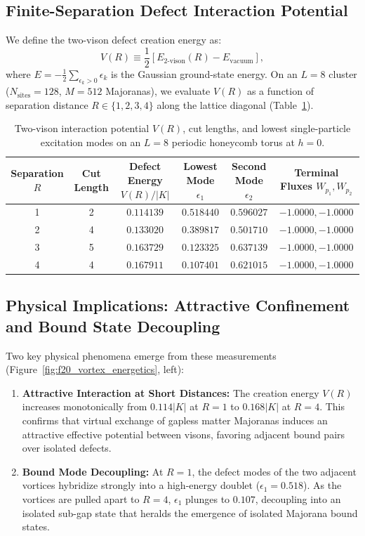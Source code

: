\subsection{Finite-Separation Defect Interaction Potential}
We define the two-vison defect creation energy as:
\begin{equation}
\label{eq:vison_creation_potential}
V(R) \equiv \frac{1}{2} \left[ E_{\mathrm{2\text{-}vison}}(R) - E_{\mathrm{vacuum}} \right],
\end{equation}
where $E = -\frac{1}{2} \sum_{\epsilon_k > 0} \epsilon_k$ is the Gaussian ground-state energy. On an $L = 8$ cluster ($N_{\mathrm{sites}} = 128$, $M = 512$ Majoranas), we evaluate $V(R)$ as a function of separation distance $R \in \{1, 2, 3, 4\}$ along the lattice diagonal (Table~\ref{tab:vortex_potential_scaling}).

\begin{table}[h]
\centering
\caption{Two-vison interaction potential $V(R)$, cut lengths, and lowest single-particle excitation modes on an $L = 8$ periodic honeycomb torus at $h = 0$.}
\label{tab:vortex_potential_scaling}
\vspace{2mm}
\begin{tabular}{cccccc}
\toprule
\textbf{Separation} $R$ & \textbf{Cut Length} & \textbf{Defect Energy} $V(R) / |K|$ & \textbf{Lowest Mode} $\epsilon_1$ & \textbf{Second Mode} $\epsilon_2$ & \textbf{Terminal Fluxes} $W_{p_1}, W_{p_2}$ \\
\midrule
1 & 2 & $0.114139$ & $0.518440$ & $0.596027$ & $-1.0000, -1.0000$ \\
2 & 4 & $0.133020$ & $0.389817$ & $0.501710$ & $-1.0000, -1.0000$ \\
3 & 5 & $0.163729$ & $0.123325$ & $0.637139$ & $-1.0000, -1.0000$ \\
4 & 4 & $0.167911$ & $0.107401$ & $0.621015$ & $-1.0000, -1.0000$ \\
\bottomrule
\end{tabular}
\end{table}

\subsection{Physical Implications: Attractive Confinement and Bound State Decoupling}
Two key physical phenomena emerge from these measurements (Figure~\ref{fig:f20_vortex_energetics}, left):
\begin{enumerate}
\item \textbf{Attractive Interaction at Short Distances:} The creation energy $V(R)$ increases monotonically from $0.114 |K|$ at $R = 1$ to $0.168 |K|$ at $R = 4$. This confirms that virtual exchange of gapless matter Majoranas induces an attractive effective potential between visons, favoring adjacent bound pairs over isolated defects.
\item \textbf{Bound Mode Decoupling:} At $R = 1$, the defect modes of the two adjacent vortices hybridize strongly into a high-energy doublet ($\epsilon_1 = 0.518$). As the vortices are pulled apart to $R = 4$, $\epsilon_1$ plunges to $0.107$, decoupling into an isolated sub-gap state that heralds the emergence of isolated Majorana bound states.
\end{enumerate}

